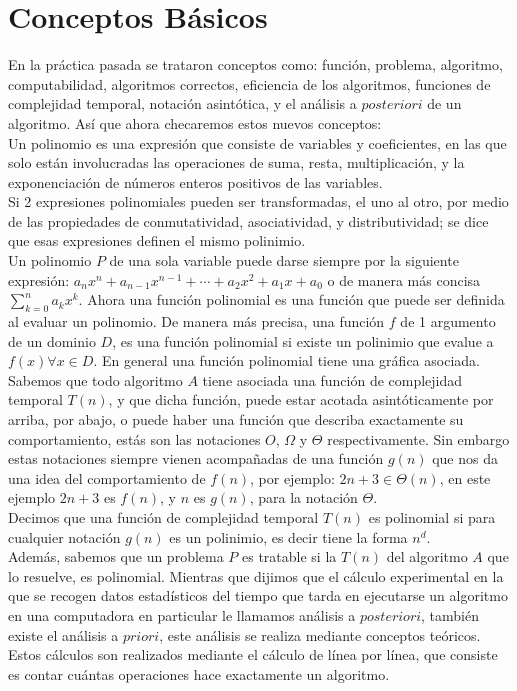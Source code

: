 \documentclass[12pt,twoside]{article}
\begin{document}
\section{Conceptos B\'asicos}
En la práctica pasada se trataron conceptos como: función, problema, algoritmo, computabilidad, algoritmos correctos, eficiencia de los algoritmos, funciones de complejidad temporal, notación asintótica, y el análisis a $posteriori$ de un algoritmo.
Así que ahora checaremos estos nuevos conceptos:
\newline
\\ Un polinomio es una expresión que consiste de variables y coeficientes, en las que solo están involucradas las operaciones de suma, resta, multiplicación, y la exponenciación de números enteros positivos de las variables.
\\ Si 2 expresiones polinomiales pueden ser transformadas, el uno al otro, por medio de las propiedades de conmutatividad, asociatividad, y distributividad; se dice que esas expresiones definen el mismo polinimio.
\\ Un polinomio $P$ de una sola variable puede darse siempre por la siguiente expresión: $a_nx^n+a_{n-1}x^{n-1}+\dotsb+a_2x^2+a_1x+a_0$ o de manera más concisa $\sum_{k=0}^{n} a_{k}x^{k}$. Ahora una función polinomial es una función que puede ser definida al evaluar un polinomio. De manera más precisa, una función $f$ de 1 argumento de un dominio $D$, es una función polinomial si existe un polinimio que evalue a $f(x) \forall x \in D$. En general una función polinomial tiene una gráfica asociada.
\newline
\\ Sabemos que todo algoritmo $A$ tiene asociada una función de complejidad temporal $T(n)$, y que dicha función, puede estar acotada asintóticamente por arriba, por abajo, o puede haber una función que describa exactamente su comportamiento, estás son las notaciones $O$, $\Omega$ y $\Theta$ respectivamente. Sin embargo estas notaciones siempre vienen acompañadas de una función $g(n)$ que nos da una idea del comportamiento de $f(n)$, por ejemplo: $2n+3\in \Theta(n)$, en este ejemplo $2n+3$ es $f(n)$, y $n$ es $g(n)$, para la notación $\Theta$.
\\Decimos que una función de complejidad temporal $T(n)$ es polinomial si para cualquier notación $g(n)$ es un polinimio, es decir tiene la forma $n^{d}$. 
\\Además, sabemos que un problema $P$ es tratable si la $T(n)$ del algoritmo $A$ que lo resuelve, es polinomial.
\newpage
Mientras que dijimos que el cálculo experimental en la que se recogen datos estadísticos del tiempo que tarda en ejecutarse un algoritmo en una computadora en particular le llamamos análisis a $posteriori$, también existe el análisis a $priori$, este análisis se realiza mediante conceptos teóricos. Estos cálculos son realizados mediante el cálculo de línea por línea, que consiste es contar cuántas operaciones hace exactamente un algoritmo.
\end{document}
